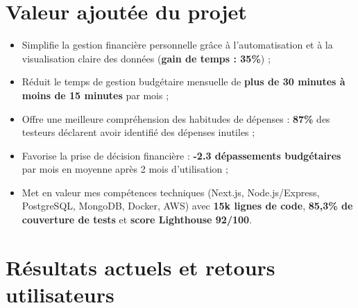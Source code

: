 
\section{Valeur ajoutée du projet}

\begin{tcolorbox}[colback=green!5!white,colframe=green!60!black,title=\textbf{Apports mesurables du projet My Smart Budget}]
\begin{itemize}
    \item Simplifie la gestion financière personnelle grâce à l'automatisation et à la visualisation claire des données (\textbf{gain de temps : 35\%}) ;
    \item Réduit le temps de gestion budgétaire mensuelle de \textbf{plus de 30 minutes à moins de 15 minutes} par mois ;
    \item Offre une meilleure compréhension des habitudes de dépenses : \textbf{87\%} des testeurs déclarent avoir identifié des dépenses inutiles ;
    \item Favorise la prise de décision financière : \textbf{-2.3 dépassements budgétaires} par mois en moyenne après 2 mois d'utilisation ;
    \item Met en valeur mes compétences techniques (Next.js, Node.js/Express, PostgreSQL, MongoDB, Docker, AWS) avec \textbf{15k lignes de code}, \textbf{85,3\% de couverture de tests} et \textbf{score Lighthouse 92/100}.
\end{itemize}
\end{tcolorbox}


\section{Résultats actuels et retours utilisateurs}

